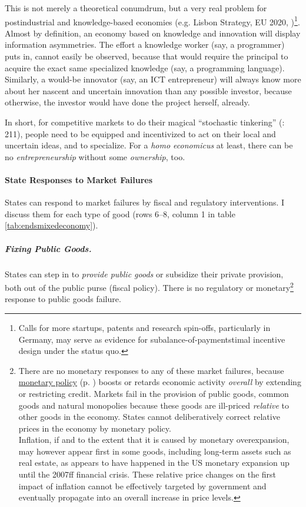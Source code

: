 This is not merely a theoretical conumdrum, but a very real problem for postindustrial  and knowledge-based economies (e.g. Lisbon Strategy, EU 2020, \citealt{Bell-1973-aa})\footnote{
	Calls for more startups, patents and research spin-offs, particularly in Germany, may serve as evidence for subalance-of-paymentstimal incentive design under the status quo.}. 
Almost by definition, an economy based on knowledge and innovation will display information asymmetries. The effort a knowledge worker (say, a programmer) puts in, cannot easily be observed, because that would require the principal to acquire the exact same specialized knowledge (say, a programming language). Similarly, a would-be innovator (say, an \gls{ICT} entrepreneur) will always know more about her nascent and uncertain innovation than any possible investor, because otherwise, the investor would have done the project herself, already. 

In short, for competitive markets to do their magical ``stochastic tinkering'' (\citealt{Taleb2007}: 211), people need to be equipped and incentivized to act on their local and uncertain ideas, and to specialize. For a \emph{homo economicus} at least, there can be no \emph{entrepreneurship} without some \emph{ownership}, too.	

\paragraph{State Responses to Market Failures}  \label{sec:stateresponses} States can respond to market failures by fiscal and regulatory interventions. I discuss them for each type of good (rows 6--8, column 1 in table \ref{tab:endsmixedeconomy}).

\subparagraph{Fixing Public Goods.}  \label{sec:publicgoodresponse} States can step in to \emph{provide public goods} or subsidize their private provision, both out of the public purse (fiscal policy). There is no regulatory or monetary\footnote{
	\label{fn:monetarycommons}There are no monetary responses to any of these market failures, because \hyperref[sec:monetary]{monetary policy} (p.  \pageref{sec:monetary}) boosts or retards economic activity \emph{overall} by extending or restricting credit. Markets fail in the provision of public goods, common goods and natural monopolies because these goods are ill-priced \emph{relative} to other goods in the economy. States cannot deliberatively correct relative prices in the economy by monetary policy. \\
	Inflation, if and to the extent that it is caused by monetary overexpansion, may however appear first in some goods, including long-term assets such as real estate, as appears to have happened in the US monetary expansion up until the 2007ff financial crisis. These relative price changes on the first impact of inflation cannot be effectively targeted by government and eventually propagate into an overall increase in price levels.} %
response to public goods failure.

